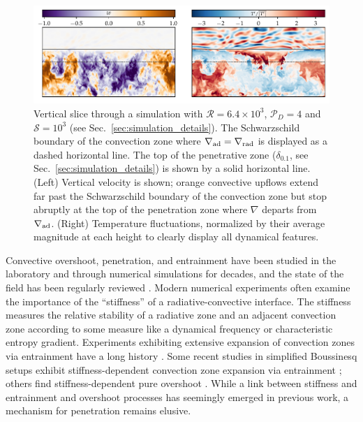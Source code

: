 \documentclass[twocolumn]{aastex631}
\newcommand{\gradrad}{\ensuremath{\nabla_{\rm{rad}}}}
\newcommand{\gradad}{\ensuremath{\nabla_{\rm{ad}}}}
\newcommand{\justgrad}{\ensuremath{\nabla}}
\newcommand{\mP}{\ensuremath{\mathcal{P}}}
\newcommand{\mR}{\ensuremath{\mathcal{R}}}
\newcommand{\mS}{\ensuremath{\mathcal{S}}}
\begin{document}
\begin{figure}[t]
\centering
\includegraphics[width=\textwidth]{vertical_dynamics_panels.pdf}
\caption{
Vertical slice through a simulation with $\mR = 6.4 \times 10^3$, $\mP_D = 4$ and $\mS = 10^3$ (see Sec.~\ref{sec:simulation_details}).
The Schwarzschild boundary of the convection zone where $\gradad = \gradrad$ is displayed as a dashed horizontal line.
The top of the penetrative zone ($\delta_{0.1}$, see Sec.~\ref{sec:simulation_details}) is shown by a solid horizontal line.
(Left) Vertical velocity is shown; orange convective upflows extend far past the Schwarzschild boundary of the convection zone but stop abruptly at the top of the penetration zone where $\justgrad$ departs from $\gradad$.
(Right) Temperature fluctuations, normalized by their average magnitude at each height to clearly display all dynamical features.
\label{fig:vertical_dynamics_panels}
}
\end{figure}



Convective overshoot, penetration, and entrainment have been studied in the laboratory and through numerical simulations for decades, and the state of the field has been regularly reviewed \citep[e.g.,][]{marcus_etal_1983, zahn1991, browning_etal_2004, rogers_etal_2006, viallet_etal_2015, korre_etal_2019}.
Modern numerical experiments often examine the importance of the ``stiffness'' of a radiative-convective interface.
The stiffness measures the relative stability of a radiative zone and an adjacent convection zone according to some measure like a dynamical frequency or characteristic entropy gradient.
Experiments exhibiting extensive expansion of convection zones via entrainment have a long history \citep[dating back to e.g.,][and this process is often confusingly called ``penetration'']{musman1968, deardorff_etal_1969, moore_weiss_1973}.
Some recent studies in simplified Boussinesq setups exhibit stiffness-dependent convection zone expansion via entrainment \citep{couston_etal_2017, toppaladoddi_wettlaufer_2018}; others find stiffness-dependent pure overshoot \citep{korre_etal_2019}.
While a link between stiffness and entrainment and overshoot processes has seemingly emerged in previous work, a mechanism for penetration remains elusive.
\end{document}
